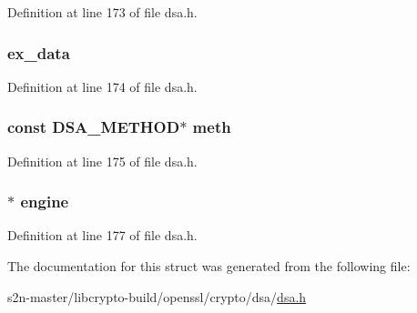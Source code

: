Definition at line 173 of file dsa.\+h.

\subsubsection[{\texorpdfstring{ex\+\_\+data}{ex_data}}]{ ex\+\_\+data}\hypertarget{structdsa__st_ac3e4fd59d6ee44a81f3a58114613c1e2}{}\label{structdsa__st_ac3e4fd59d6ee44a81f3a58114613c1e2}


Definition at line 174 of file dsa.\+h.

\subsubsection[{\texorpdfstring{meth}{meth}}]{\setlength{\rightskip}{0pt plus 5cm}const {\bf D\+S\+A\+\_\+\+M\+E\+T\+H\+OD}$\ast$ meth}\hypertarget{structdsa__st_a15d9e2d9b636f1dc128827bd890f94d2}{}\label{structdsa__st_a15d9e2d9b636f1dc128827bd890f94d2}


Definition at line 175 of file dsa.\+h.

\subsubsection[{\texorpdfstring{engine}{engine}}]{$\ast$ engine}\hypertarget{structdsa__st_a4eb35fa252ec72ad7c53a4c8d30a7fd3}{}\label{structdsa__st_a4eb35fa252ec72ad7c53a4c8d30a7fd3}


Definition at line 177 of file dsa.\+h.



The documentation for this struct was generated from the following file\+:\begin{DoxyCompactItemize}
\item 
s2n-\/master/libcrypto-\/build/openssl/crypto/dsa/\hyperlink{dsa_8h}{dsa.\+h}\end{DoxyCompactItemize}
